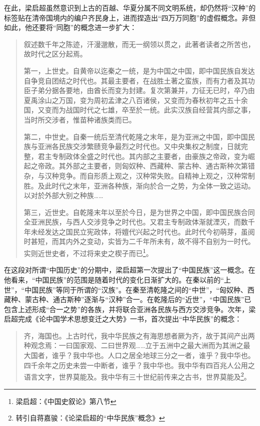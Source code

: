 在此，梁启超虽然意识到上古的百越、华夏分属不同文明系统，却仍然将“汉种”的标签贴在清帝国境内的编户齐民身上，进而捏造出“四万万同胞”的虚假概念。非但如此，他还要将“同胞”的概念进一步扩大：


\begin{quote}

叙述数千年之陈迹，汗漫邈散，而无一纲领以贯之，此著者读者之所苦也，故时代之区分起焉。

第一，上世史。自黄帝以迄秦之一统，是为中国之中国，即中国民族自发达自争竞自团结之时代也。其最主要者，在战胜土著之蛮族，而有力者及其功臣子弟分据各要地，由酋长而变为封建。复次第兼并，力征无已时，卒乃由夏禹涂山之万国，变为周初孟津之八百诸侯，又变而为春秋初年之五十余国，又变而为战国时代之七雄，卒至於一统。此实汉族自经营其内部之事，当时所交涉者，惟苗种诸族类而已。

第二，中世史。自秦一统后至清代乾隆之末年，是为亚洲之中国，即中国民族与亚洲各民族交涉繁赜竞争最烈之时代也。又中央集权之制度，日就完整，君主专制政体全盛之时代也。其内部之主要者，由豪族之帝政，变为崛起之帝政。其外部之主要者，则匈奴种、西藏种、蒙古种、通古斯种次第错杂，与汉种竞争。而自形质上观之，汉种常失败。自精神上观之，汉种常制胜。及此时代之末年，亚洲各种族，渐向於合一之势，为全体一致之运动。以对於外部大别之种族……

第三，近世史。自乾隆末年以至於今日，是为世界之中国，即中国民族合同全亚洲民族，与西人交涉竞争之时代也。又君主专制政体渐就湮灭，而数千年未经发达之国民立宪政体，将嬗代兴起之时代也。此时代今初萌芽，虽阅时甚短，而其内外之变动，实皆为二千年所未有，故不得不自别为一时代。实则近世史者，不过将来史之楔子而已\footnote{梁启超：《中国史叙论》第八节}。

\end{quote}

在这段对所谓“中国历史”的分期中，梁启超第一次提出了“中国民族”这一概念。在他看来，“中国民族”的范围是随着时代的变化日渐扩大的。在秦以前的“上世”，“中国民族”等同于所谓的“汉族”。在秦至清乾隆之间的“中世”，“匈奴种、西藏种、蒙古种、通古斯种”逐渐与“汉种”合一。在乾隆后的“近世”，“中国民族”已包含上述形成“合一之势”的各族，并将联合亚洲各民族与西方交涉竞争。次年，梁启超完成《论中国学术思想变迁之大势》一书，首次提出“中华民族”的概念：

\begin{quote}
齐，海国也。上古时代，我中华民族之有海思想者厥为齐，故于其间产出两种观念焉：一曰国家观、二曰世界观……立于五洲中之最大洲而为其洲之最大国者，谁乎？我中华也。人口之居全地球三分之一者，谁乎？我中华也。四千余年之历史未尝一中断者，谁乎？我中华也。我中华有四百兆人公用之语言文字，世界莫能及。我中华有三十世纪前传来之古书，世界莫能及\footnote{转引自蒋嘉骏：《论梁启超的“中华民族”概念》}。

\end{quote}

